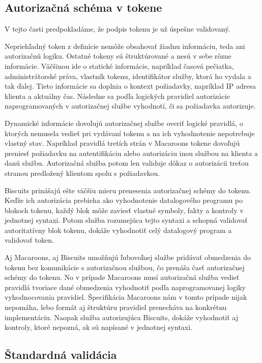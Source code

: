 \subsection{Autorizačná schéma v tokene}

V tejto časti predpokladáme, že podpis tokenu je už úspešne validovaný.

Nepriehľadný token z definície nemôže obsahovať žiadnu informáciu, teda ani autorizačnú logiku. Ostatné tokeny sú štruktúrované a nesú v sebe rôzne informácie. Väčšinou ide o statické informácie, napríklad časová pečiatka, administrátorské práva, vlastník tokenu, identifikátor služby, ktorá ho vydala a tak ďalej. Tieto informácie sa doplnia o kontext požiadavky, napríklad IP adresa klienta a aktuálny čas. Následne sa podľa logických pravidiel autorizácie naprogramovaných v autorizačnej službe vyhodnotí, či sa požiadavka autorizuje.

Dynamické informácie dovoľujú autorizačnej službe overiť logické pravidlá, o ktorých nemusela vedieť pri vydávaní tokenu a na ich vyhodnotenie nepotrebuje vlastný stav. Napríklad pravidlá tretích strán v Macaroons tokene dovoľujú preniesť požiadavku na autentifikáciu alebo autorizáciu inou službou na klienta a danú službu. Autorizačná služba potom len validuje dôkaz o autorizácii treťou stranou predložený klientom spolu s požiadavkou.

Biscuits prinášajú ešte väčšiu mieru prenesenia autorizačnej schémy do tokenu. Keďže ich autorizácia prebieha ako vyhodnotenie datalogového programu po blokoch tokenu, každý blok môže zaviesť vlastné symboly, fakty a kontroly v jednotnej syntaxi. Potom služba rozumejúca tejto syntaxi a schopná validovať autoritatívny blok tokenu, dokáže vyhodnotiť celý datalogový program a validovať token.

Aj Macaroons, aj Biscuits umožňujú ľubovoľnej službe pridávať obmedzenia do tokenu bez komunikácie s autorizačnou službou, čo prenáša časť autorizačnej schémy do tokenu. No v prípade Macaroons musí autorizačná služba vedieť pravidlá tvoriace dané obmedzenia vyhodnotiť podľa naprogramovanej logiky vyhodnocovania pravidiel. Špecifikácia Macaroons \cite{macaroons_paper} nám v tomto prípade nijak nepomáha, lebo formát aj štruktúru pravidiel prenecháva na konkrétnu implementáciu. Naopak služba autorizujúca Biscuits, dokáže vyhodnotiť aj kontroly, ktoré nepozná, ak sú napísané v jednotnej syntaxi.

\subsection{Štandardná validácia}

